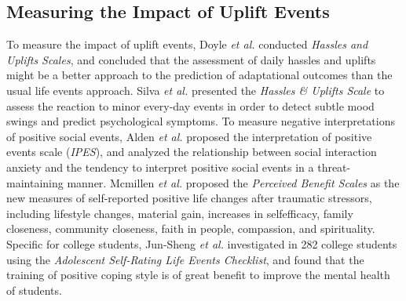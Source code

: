 \subsection{Measuring the Impact of Uplift Events}
To measure the impact of uplift events,
Doyle \emph{et al.} \cite{Kanner1981Comparison} conducted \emph{Hassles and Uplifts Scales},
and concluded that the assessment of daily hassles and uplifts might be a better approach to the prediction of adaptational outcomes than the usual life events approach.
Silva \emph{et al.} \cite{Silva2008The} presented the \emph{Hassles \& Uplifts Scale} to assess the reaction to minor every-day events in order to detect subtle mood swings and predict psychological symptoms.
To measure negative interpretations of positive social events,
Alden \emph{et al.} \cite{Alden2008Social} proposed the interpretation of positive events scale (\emph{IPES}), and analyzed the relationship between social interaction anxiety and the tendency to interpret positive social events in a threat-maintaining manner.
Mcmillen \emph{et al.} \cite{Mcmillen1998The} proposed the \emph{Perceived Benefit Scales} as the new measures of self-reported positive life changes after traumatic stressors, including lifestyle changes, material gain, increases in selfefficacy, family closeness, community closeness, faith in people, compassion, and spirituality.
Specific for college students,
Jun-Sheng \emph{et al.} \cite{Jun2008Influence} investigated in 282 college students using the \emph{Adolescent Self-Rating Life Events Checklist}, and found that the training of positive coping style is of great benefit to improve the mental health of students.

